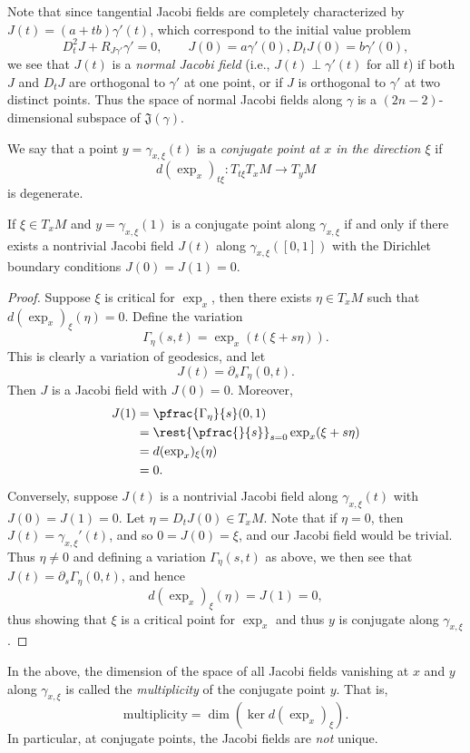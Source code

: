 Note that since tangential Jacobi fields are completely characterized by $J(t)=(a+tb)\gamma'(t)$, which correspond to the initial value problem
$$D_t^2J+R_{J\gamma'}\gamma'=0,\qquad J(0)=a\gamma'(0), D_tJ(0)=b\gamma'(0),$$
we see that $J(t)$ is a \textit{normal Jacobi field} (i.e., $J(t)\perp\gamma'(t)$ for all $t$) if both $J$ and $D_tJ$ are orthogonal to $\gamma'$ at one point, or if $J$ is orthogonal to $\gamma'$ at two distinct points.  Thus the space of normal Jacobi fields along $\gamma$ is a $(2n-2)$-dimensional subspace of $\mathfrak{J}(\gamma)$.

We say that a point $y=\gamma_{x,\xi}(t)$ is a \textit{conjugate point at $x$ in the direction $\xi$} if 
$$d(\exp_x)_{t\xi}:T_{t\xi}T_xM\to T_yM$$
is degenerate.

\begin{lem}\label{thm:conjugateJacobi}
    If $\xi\in T_xM$ and $y=\gamma_{x,\xi}(1)$ is a conjugate point along $\gamma_{x,\xi}$ if and only if there exists a nontrivial Jacobi field $J(t)$ along $\gamma_{x,\xi}([0,1])$ with the Dirichlet boundary conditions $J(0)=J(1)=0$.
\end{lem}

\begin{proof}
Suppose $\xi$ is critical for $\exp_x$, then there exists $\eta\in T_xM$ such that $d(\exp_x)_\xi(\eta)=0$.  Define the variation
$$\Gamma_\eta(s,t)=\exp_x(t(\xi+s\eta)).$$
This is clearly a variation of geodesics, and let
$$J(t)=\partial_s\Gamma_\eta(0,t).$$
Then $J$ is a Jacobi field with $J(0)=0$.  Moreover,
\begin{align*}
	J(1)&=\pfrac{\Gamma_\eta}{s}(0,1)\\
	&=\rest{\pfrac{}{s}}_{s=0}\exp_x(\xi+s\eta)\\
	&=d(\exp_x)_\xi(\eta)\\
	&=0.
\end{align*}
Conversely, suppose $J(t)$ is a nontrivial Jacobi field along $\gamma_{x,\xi}(t)$ with $J(0)=J(1)=0$.  Let $\eta=D_tJ(0)\in T_xM$.  Note that if $\eta=0$, then $J(t)=\gamma_{x,\xi}'(t)$, and so $0=J(0)=\xi$, and our Jacobi field would be trivial.  Thus $\eta\neq0$ and defining a variation $\Gamma_\eta(s,t)$ as above, we then see that $J(t)=\partial_s\Gamma_\eta(0,t)$, and hence
$$d(\exp_x)_\xi(\eta)=J(1)=0,$$
thus showing that $\xi$ is a critical point for $\exp_x$ and thus $y$ is conjugate along $\gamma_{x,\xi}$.
\end{proof}

In the above, the dimension of the space of all Jacobi fields vanishing at $x$ and $y$ along $\gamma_{x,\xi}$ is called the \textit{multiplicity} of the conjugate point $y$.  That is,
$$\text{multiplicity}=\dim\left(\ker{d(\exp_x)_{\xi}}\right).$$
In particular, at conjugate points, the Jacobi fields are \textit{not} unique.

